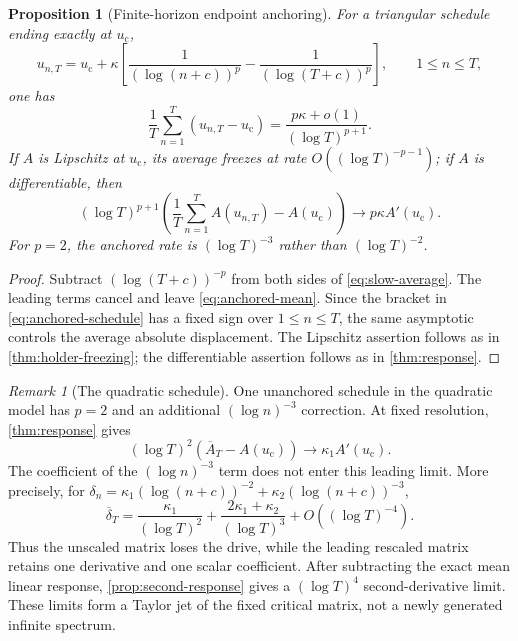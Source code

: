 \documentclass[11pt]{article}
\newtheorem{proposition}[theorem]{Proposition}
\theoremstyle{definition}
\theoremstyle{remark}
\newtheorem{remark}[theorem]{Remark}
\newcommand{\uc}{u_{\mathrm c}}
\begin{document}
\begin{proposition}[Finite-horizon endpoint anchoring]\label{prop:anchored}
For a triangular schedule ending exactly at $\uc$,
\begin{equation}\label{eq:anchored-schedule}
    u_{n,T}=\uc+\kappa\left[
      \frac1{(\log(n+c))^p}
      -\frac1{(\log(T+c))^p}
    \right],
    \qquad 1\le n\le T,
\end{equation}
one has
\begin{equation}\label{eq:anchored-mean}
    \frac1T\sum_{n=1}^T(u_{n,T}-\uc)
    =\frac{p\kappa+o(1)}{(\log T)^{p+1}}.
\end{equation}
If $A$ is Lipschitz at $\uc$, its average freezes at rate
$O((\log T)^{-p-1})$; if $A$ is differentiable, then
\begin{equation}\label{eq:anchored-response}
    (\log T)^{p+1}
    \left(\frac1T\sum_{n=1}^T A(u_{n,T})-A(\uc)\right)
    \longrightarrow p\kappa A'(\uc).
\end{equation}
For $p=2$, the anchored rate is $(\log T)^{-3}$ rather than $(\log T)^{-2}$.
\end{proposition}

\begin{proof}
Subtract $(\log(T+c))^{-p}$ from both sides of \eqref{eq:slow-average}.  The leading terms cancel and leave \eqref{eq:anchored-mean}.  Since the bracket in \eqref{eq:anchored-schedule} has a fixed sign over $1\le n\le T$, the same asymptotic controls the average absolute displacement.  The Lipschitz assertion follows as in \cref{thm:holder-freezing}; the differentiable assertion follows as in \cref{thm:response}.
\end{proof}

\begin{remark}[The quadratic schedule]\label{rem:p2}
One unanchored schedule in the quadratic model has $p=2$ and an additional $(\log n)^{-3}$ correction.  At fixed resolution, \cref{thm:response} gives
\[
    (\log T)^2(\overline A_T-A(\uc))\longrightarrow\kappa_1A'(\uc).
\]
The coefficient of the $(\log n)^{-3}$ term does not enter this leading limit.  More precisely, for
$\delta_n=\kappa_1(\log(n+c))^{-2}+\kappa_2(\log(n+c))^{-3}$,
\[
    \overline\delta_T
    =\frac{\kappa_1}{(\log T)^2}
     +\frac{2\kappa_1+\kappa_2}{(\log T)^3}
     +O((\log T)^{-4}).
\]
Thus the unscaled matrix loses the drive, while the leading rescaled matrix retains one derivative and one scalar coefficient.
After subtracting the exact mean linear response, \cref{prop:second-response} gives a $(\log T)^4$ second-derivative limit.  These limits form a Taylor jet of the fixed critical matrix, not a newly generated infinite spectrum.
\end{remark}
\end{document}
